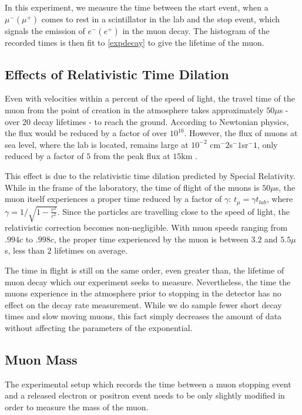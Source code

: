 In this experiment, we measure the time between the start event, when
a $\mu^- (\mu^+)$ comes to rest in a scintillator in the lab and the
stop event, which signals the emission of $e^- (e^+)$ in the muon
decay. The histogram of the recorded times is then fit to \eqref{expdecay} to
give the lifetime of the muon.

\subsection{Effects of Relativistic Time Dilation}

Even with velocities within a percent of the speed of light, the
travel time of the muon from the point of creation in the atmosphere
takes approximately $50\mu$s - over 20 decay lifetimes - to reach the
ground. According to Newtonian physics, the flux would be reduced by a
factor of over $10^{10}$. However, the flux of muons at sea level,
where the lab is located, remains large at $10^{-2}$
cm$^-2$s$^-1$sr$^-1$, only reduced by a factor of $5$ from the peak
flux at $15$km \cite{rossi}.

This effect is due to the relativistic time dilation predicted by
Special Relativity. While in the frame of the laboratory, the time of
flight of the muons is $50\mu$s, the muon itself experiences a proper
time reduced by a factor of $\gamma$: $t_{\mu} = \gamma t_{lab}$,
where $\gamma = 1/\sqrt{1 - \frac{v^2}{c^2}}$. Since the particles are
travelling close to the speed of light, the relativistic correction
becomes non-negligible. With muon speeds ranging from $.994c$ to
$.998c$, the proper time experienced by the muon is between $3.2$ and
$5.5\mu$s, less than $2$ lifetimes on average. 

The time in flight is still on the same order, even greater than, the
lifetime of muon decay which our experiment seeks to
measure. Nevertheless, the time the muons experience in the atmosphere
prior to stopping in the detector has no effect on the decay rate
measurement. While we do sample fewer short decay times and slow
moving muons, this fact simply decreases the amount of data without
affecting the parameters of the exponential.

\subsection{Muon Mass}

The experimental setup which records the time between a muon stopping
event and a released electron or positron event needs to be only
slightly modified in order to measure the mass of the muon.


